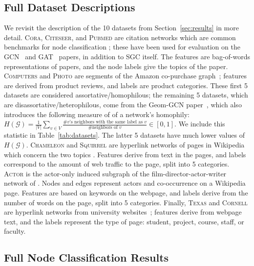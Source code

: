 \documentclass{article}
\begin{document}
\subsection{Full Dataset Descriptions} \label{app:data_describe}
We revisit the description of the 10 datasets from Section~\ref{sec:results} in more detail.
\textsc{Cora}, \textsc{Citeseer}, and \textsc{Pubmed} are citation networks which are common benchmarks for node classification \citep{sen2008collective, namata2012query}; these have been used for evaluation on the GCN~\citep{kipf2016semi} and GAT~\citep{velivckovic2018graph} papers, in addition to SGC itself.
The features are bag-of-words representations of papers, and the node labels give the topics of the paper. 
\textsc{Computers} and \textsc{Photo} are segments of the Amazon co-purchase graph~\citep{mcauley2015image, shchur2018pitfalls}; features are derived from product reviews, and labels are product categories.
These first 5 datasets are considered assortative/homophilous; the remaining 5 datasets, which are disassortative/heterophilous, come from the Geom-GCN paper~\citep{pei2020geom}, which also introduces the following measure of of a network's homophily: 
\mbox{$ H(\mathcal{G}) = \frac{1}{|V|} \sum_{v \in V} \frac{\text{\# $v$'s neighbors with the same label as $v$}}{\text{\# neighbors of $v$}} \in [0,1]$}.
We include this statistic in Table~\ref{tab:datasets}.
The latter 5 datasets have much lower values of $H(\mathcal{G})$.
\textsc{Chameleon} and \textsc{Squirrel} are hyperlink networks of pages in Wikipedia which concern the two topics \citep{rozemberczki2021multi}.
Features derive from text in the pages, and labels correspond to the amount of web traffic to the page, split into 5 categories. \textsc{Actor} is the actor-only induced subgraph of the film-director-actor-writer network of \citet{tang2009relational}. Nodes and edges represent actors and co-occurrence on a Wikipedia page. Features are based on keywords on the webpage, and labels derive from the number of words on the page, split into 5 categories.
Finally, \textsc{Texas} and \textsc{Cornell} are hyperlink networks from university websites~\citep{craven2000learning}; features derive from webpage text, and the labels represent the type of page: student, project, course, staff, or faculty.

\subsection{Full Node Classification Results}\label{app:full_results}
\end{document}
